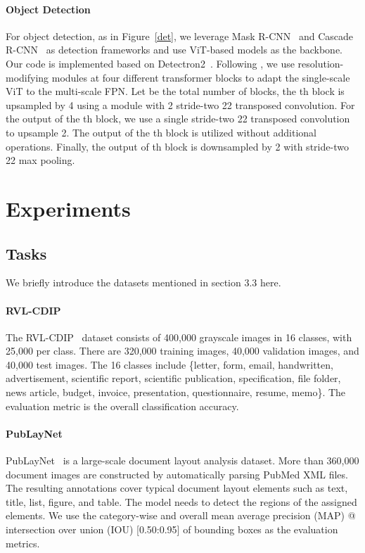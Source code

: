\documentclass[sigconf]{acmart}
\begin{document}
\paragraph{Object Detection}
For object detection, as in Figure~\ref{det}, we leverage Mask R-CNN~\citep{he2017mask} and Cascade R-CNN~\citep{cai2018cascade} as detection frameworks and use ViT-based models as the backbone. Our code is implemented based on Detectron2~\citep{wu2019detectron2}. Following \citep{ElNouby2021XCiTCI, Li2021BenchmarkingDT}, we use  resolution-modifying modules at four different transformer blocks to adapt the single-scale ViT to the multi-scale FPN. Let  be the total number of blocks, the th block is upsampled by 4 using a module with 2 stride-two 22 transposed convolution.
For the output of the th block, we use a single stride-two 22 transposed convolution to upsample 2.
The output of the th block is utilized without additional operations.
Finally, the output of th block is downsampled by 2 with stride-two 22 max pooling.




\section{Experiments}

\subsection{Tasks}
We briefly introduce the datasets mentioned in section 3.3 here.

\paragraph{RVL-CDIP}
The RVL-CDIP~\citep{harley2015icdar} dataset consists of 400,000 grayscale images in 16 classes, with 25,000 per class. There are 320,000 training images, 40,000 validation images, and 40,000 test images. 
The 16 classes include \{letter, form, email, handwritten, advertisement, scientific report, scientific publication, specification, file folder, news article, budget, invoice, presentation, questionnaire, resume, memo\}. The evaluation metric is the overall classification accuracy. 

\paragraph{PubLayNet}
 PubLayNet~\citep{zhong2019publaynet} is a large-scale document layout analysis dataset. More than 360,000 document images are constructed by automatically parsing PubMed XML files. The resulting annotations cover typical document layout elements such as text, title, list, figure, and table. The model needs to detect the regions of the assigned elements. We use the category-wise and overall mean average precision (MAP) @ intersection over union (IOU) [0.50:0.95] of bounding boxes as the evaluation metrics.
\end{document}
